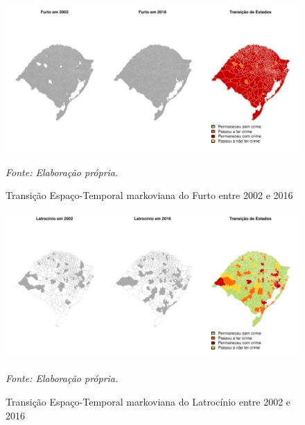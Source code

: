 \documentclass[12pt,openright,oneside,a4paper,english,french,spanish]{abntex2}
\numberwithin{table}{section} %
\numberwithin{figure}{section} %
\newcommand{\source}[1]{\textit{#1}}
\begin{document}
\begin{subappendices}
\begin{figure}[H]
\begin{center}
\includegraphics{TESE_DE_DOUTORADO_RENAN_FINAL-map_furto_2002_2016}
\end{center}
\caption{Transição Espaço-Temporal markoviana do Furto entre 2002 e 2016}
\source{Fonte: Elaboração própria.}
\label{fig:mapas_furto_markov_2002_2016}
\end{figure}

\begin{figure}[H]
\begin{center}
\includegraphics{TESE_DE_DOUTORADO_RENAN_FINAL-map_latro_2002_2016}
\end{center}
\caption{Transição Espaço-Temporal markoviana do Latrocínio entre 2002 e 2016}
\source{Fonte: Elaboração própria.}
\label{fig:mapas_latrocinio_markov_2002_2016}
\end{figure}


\end{subappendices}
\end{document}
